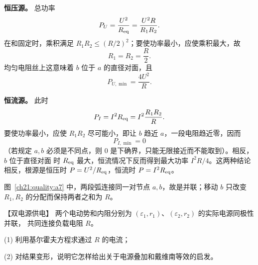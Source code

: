 {\begin{xesolution}
\textbf{恒压源。} 总功率
\[
  P_U=\frac{U^2}{R_{\rm eq}}=\frac{U^2R}{R_1R_2}.
\]
在和固定时，乘积满足 $R_1R_2\le(R/2)^2$；要使功率最小，应使乘积最大，故
\[
  R_1=R_2=\frac R2.
\]
均匀电阻丝上这意味着 $b$ 位于 $a$ 的直径对面，且
\[
  \boxed{P_{U,\min}=\frac{4U^2}{R}}.
\]

\textbf{恒流源。} 此时
\[
  P_I=I^2R_{\rm eq}=I^2\frac{R_1R_2}{R}.
\]
要使功率最小，应使 $R_1R_2$ 尽可能小，即让 $b$ 趋近 $a$，一段电阻趋近零，因而
\[
  \boxed{P_{I,\min}=0}
\]
（若规定 $a,b$ 必须是不同点，则 $0$ 是下确界，只能无限接近而不能取到）。相反，$b$ 位于直径对面
时 $R_{\rm eq}$ 最大，恒流情况下反而得到最大功率 $I^2R/4$。这两种结论相反，根源是恒压时
$P=U^2/R_{\rm eq}$，恒流时 $P=I^2R_{\rm eq}$。

图~\ref{ch21:quality:a7} 中，两段弧连接同一对节点 $a,b$，故是并联；移动 $b$ 只改变 $R_1,R_2$ 的分配而保持两者之和为 $R$。
\end{xesolution}



\begin{origexamplebox}{【双电源供电】}\label{ch21:ex:s36-5-8}
两个电动势和内阻分别为 $(\varepsilon_1,r_1)$、$(\varepsilon_2,r_2)$ 的实际电源同极性并联，
共同连接负载电阻 $R$。

(1) 利用基尔霍夫方程求通过 $R$ 的电流；

(2) 对结果变形，说明它怎样给出关于电源叠加和戴维南等效的启发。
\par\noindent\begin{minipage}{\linewidth}
\dualSourceFigure
{}
\end{minipage}\par\medskip
\end{origexamplebox}\par\nopagebreak[4]


}
